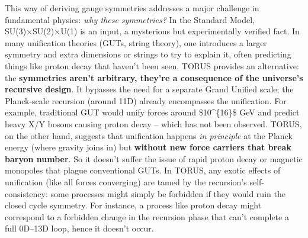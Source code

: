 \documentclass[
]{article}
\begin{document}
This way of deriving gauge symmetries addresses a major challenge in
fundamental physics: \emph{why these symmetries?} In the Standard Model,
SU(3)×SU(2)×U(1) is an input, a mysterious but experimentally verified
fact. In many unification theories (GUTs, string theory), one introduces
a larger symmetry and extra dimensions or strings to try to explain it,
often predicting things like proton decay that haven't been seen. TORUS
provides an alternative: the \textbf{symmetries aren't arbitrary,
they're a consequence of the universe's recursive design}. It bypasses
the need for a separate Grand Unified scale; the Planck-scale recursion
(around 11D) already encompasses the unification\hspace{0pt}. For
example, traditional GUT would unify forces around \$10\^{}\{16\}\$ GeV
and predict heavy X/Y bosons causing proton decay -- which has not been
observed. TORUS, on the other hand, suggests that unification happens
\emph{in principle} at the Planck energy (where gravity joins in) but
\textbf{without new force carriers that break baryon number}. So it
doesn't suffer the issue of rapid proton decay or magnetic monopoles
that plague conventional GUTs\hspace{0pt}. In TORUS, any exotic effects
of unification (like all forces converging) are tamed by the recursion's
self-consistency: some processes might simply be forbidden if they would
ruin the closed cycle symmetry. For instance, a process like proton
decay might correspond to a forbidden change in the recursion phase that
can't complete a full 0D--13D loop, hence it doesn't occur.
\end{document}
